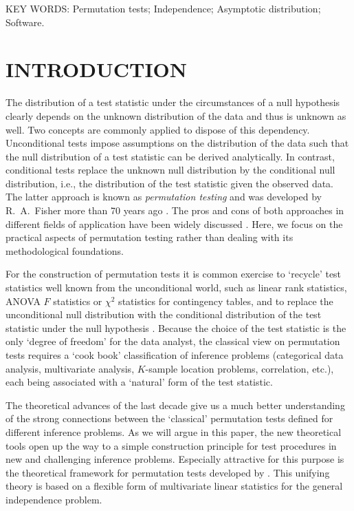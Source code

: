 \documentclass{article}
\begin{document}
\noindent
KEY WORDS: Permutation tests; Independence; Asymptotic distribution; Software.
\newline



\section{INTRODUCTION}

The distribution of a test statistic under the circumstances of a 
null hypothesis clearly depends on the unknown distribution of the data and
thus is unknown as well.
Two concepts are commonly applied to dispose of this dependency.
Unconditional tests impose assumptions on the distribution of the data such
that the null distribution of a test statistic can be derived analytically. In contrast, 
conditional tests
replace the unknown null distribution by the conditional null distribution,
i.e., the distribution of the test statistic given the observed data. The
latter approach is known as \textit{permutation testing} and was developed
by R.~A.~Fisher more than 70 years ago \citep{Fisher1935}. 
The pros and cons of both approaches in different fields of application 
have been widely discussed \citep[e.g.~by][]{why-permut:1998,pros-and-c:2000,Shuster2005}.
Here, we focus on the practical aspects of permutation testing rather than
dealing with its methodological foundations.

For the construction of permutation tests it is common exercise to `recycle'
test statistics well known from the unconditional world, such as linear rank
statistics, ANOVA $F$ statistics or $\chi^2$ statistics for
contingency tables, and to replace the unconditional null distribution with
the conditional distribution of the test statistic under the null
hypothesis \citep{Edgington1987,Good2000,Pesarin2001,Ernst2004}. 
Because the choice of the test statistic is the only `degree of freedom' for
the data analyst,
the classical view on permutation tests requires 
a `cook book' classification of inference problems (categorical data
analysis, multivariate analysis, $K$-sample location problems, correlation,
etc.), each being associated with a `natural' form of the test statistic.

The theoretical advances of the last decade \citep[notably][]{StrasserWeber1999,
Pesarin2001,JanssenPauls2003}
give us a much better understanding of the strong connections between the 
`classical' permutation tests defined for different inference problems. 
As we will argue in this paper, the new
theoretical tools open up the way to a simple construction principle 
for test procedures in new and challenging inference problems.
Especially attractive for this purpose is the theoretical framework for
permutation tests developed by \cite{StrasserWeber1999}. This unifying
theory is based on a flexible form of multivariate linear statistics for the
general independence problem. 
\end{document}
